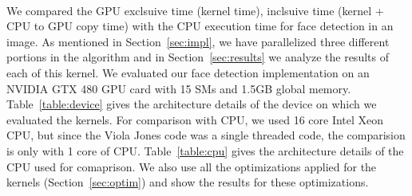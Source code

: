 \vspace{-0.1in}
\begin{table}[h]
    \centering
    \vspace{0.05in}
    \caption{Arch. details of the CPU used}
    \label{table:cpu}
\end{table}

\paragraph{}
We compared the GPU exclsuive time (kernel time),
inclsuive time (kernel + CPU to GPU copy time) with the CPU execution time 
for face detection in an image.
As mentioned in Section~\ref{sec:impl}, we have parallelized three different
portions in the algorithm and in Section~\ref{sec:results} we analyze the results of each of this kernel.
We evaluated our face detection implementation on an NVIDIA GTX 480 GPU card with 15 SMs and 1.5GB global memory.
Table~\ref{table:device} gives the architecture details of the device on which we evaluated the kernels. For comparison with CPU, 
we used 16 core Intel Xeon CPU, but since the Viola Jones code was a single threaded code, the comparision is only with
1 core of CPU. Table~\ref{table:cpu} gives the architecture details of the CPU used for comaprison. 
We also use all the optimizations applied for the kernels (Section~\ref{sec:optim}) and show the
results for these optimizations. 

